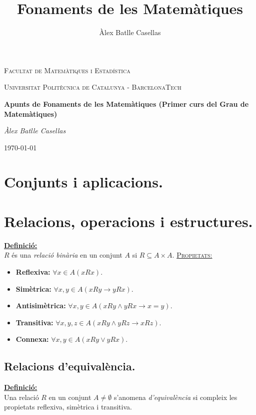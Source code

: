 \documentclass[11pt]{article}
\title{Fonaments de les Matemàtiques}
\author{Àlex Batlle Casellas}
\newcommand{\propietats}{\underline{{\scshape Propietats:}}}
\newcommand{\definicio}{\underline{\textbf{Definició:}}\\}
\begin{document}
\begin{titlepage}
	\centering
	{\scshape\LARGE Facultat de Matemàtiques i Estadística \par}
	\vspace{1cm}
	{\scshape\Large Universitat Politècnica de Catalunya - BarcelonaTech\par}
	\vspace{1.5cm}
	{\huge\bfseries Apunts de Fonaments de les Matemàtiques (Primer curs del Grau de Matemàtiques)
	\par}
	\vspace{2cm}
	{\Large\itshape Àlex Batlle Casellas\par}

	\vfill

	{\large \today\par}
\end{titlepage}


\vfill
\newpage

\tableofcontents
\newpage
\section{}
\section{Conjunts i aplicacions.}
\section{Relacions, operacions i estructures.}
\definicio $R$ és una \textit{relació binària} en un conjunt $A$ si $R\subseteq A\times A$.
\propietats \begin{itemize}
	\item \textbf{Reflexiva:} $\forall x\in A (xRx)$.
	\item \textbf{Simètrica:} $\forall x,y\in A (xRy \rightarrow yRx)$.
	\item \textbf{Antisimètrica:} $\forall x,y\in A (xRy\wedge yRx\rightarrow x=y)$.
	\item \textbf{Transitiva:} $\forall x,y,z\in A (xRy\wedge yRz\rightarrow xRz)$.
	\item \textbf{Connexa:} $\forall x,y\in A (xRy\vee yRx)$.
\end{itemize}
\subsection{Relacions d'equivalència.}
\definicio Una relació $R$ en un conjunt $A\neq\emptyset$ s'anomena \textit{d'equivalència} si compleix les propietats reflexiva, simètrica i transitiva.
\end{document}
